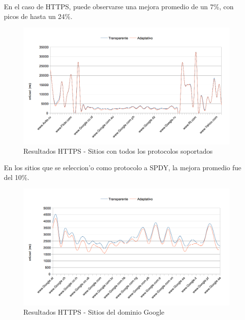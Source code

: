 En el caso de HTTPS, puede observarse una mejora promedio de un 7\%, con picos de hasta un 24\%.

\begin{figure}[h!]
  	\centering
	\includegraphics[width=\textwidth]{img/resGralHTTPS}
	\caption{\small Resultados HTTPS - Sitios con todos los protocolos soportados}
	\label{resGralHTTPS}
\end{figure}

En los sitios que se seleccion'o como protocolo a SPDY, la mejora promedio fue del 10\%.

\begin{figure}[h!]
  	\centering
	\includegraphics[width=\textwidth]{img/resGoogleHTTPS}
	\caption{\small Resultados HTTPS - Sitios del dominio Google}
	\label{resGoogleHTTPS}
\end{figure}

